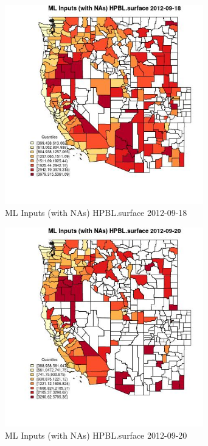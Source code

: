 \begin{figure} 
\centering  
\includegraphics[width=0.77\textwidth]{Code_Outputs/Report_ML_input_PM25_Step4_part_e_de_duplicated_aves_compiled_2019-05-14wNAs_CountyHPBLsurfaceMean2012-09-18_2012-09-18.jpg} 
\caption{\label{fig:Report_ML_input_PM25_Step4_part_e_de_duplicated_aves_compiled_2019-05-14wNAsCountyHPBLsurfaceMean2012-09-18_2012-09-18}ML Inputs (with NAs) HPBL.surface 2012-09-18} 
\end{figure} 
 

\begin{figure} 
\centering  
\includegraphics[width=0.77\textwidth]{Code_Outputs/Report_ML_input_PM25_Step4_part_e_de_duplicated_aves_compiled_2019-05-14wNAs_CountyHPBLsurfaceMean2012-09-20_2012-09-20.jpg} 
\caption{\label{fig:Report_ML_input_PM25_Step4_part_e_de_duplicated_aves_compiled_2019-05-14wNAsCountyHPBLsurfaceMean2012-09-20_2012-09-20}ML Inputs (with NAs) HPBL.surface 2012-09-20} 
\end{figure} 
 


